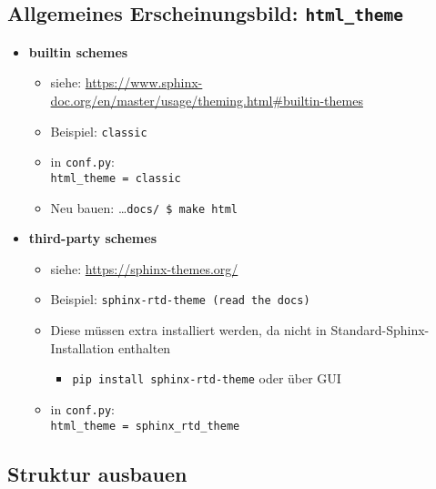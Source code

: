 \hypertarget{allgemeines-erscheinungsbild-html_theme}{%
	\subsection{\texorpdfstring{\textbf{Allgemeines Erscheinungsbild:
				\texttt{html\_theme}}}{Allgemeines Erscheinungsbild: html\_theme}}\label{allgemeines-erscheinungsbild-html_theme}}

\begin{itemize}	
	\item
	\textbf{builtin schemes}	
	\begin{itemize}	
		\item siehe:
		\url{https://www.sphinx-doc.org/en/master/usage/theming.html\#builtin-themes}
		\item
		Beispiel: \texttt{classic}
		\item
		in \texttt{conf.py}:\\ \hspace*{0.5cm}
		\texttt{html\_theme\ =\ \textquotesingle{}classic\textquotesingle{}}
		\item Neu bauen:
		\ldots{}\texttt{docs/\ \$\ make\ html}
	\end{itemize}
	\item
	\textbf{third-party schemes}
	\begin{itemize}
		\item siehe:
		\url{https://sphinx-themes.org/}
		\item
		Beispiel: \texttt{sphinx-rtd-theme\ (read\ the\ docs)}
		\item
		Diese müssen extra installiert werden, da nicht in Standard-Sphinx-Installation
		enthalten
		\begin{itemize}
			
			\item
			\texttt{pip\ install\ sphinx-rtd-theme} oder über GUI
		\end{itemize}
		\item
		in \texttt{conf.py}:\\ \hspace*{0.5cm}
		\texttt{html\_theme\ =\ \textquotesingle{}sphinx\_rtd\_theme\textquotesingle{}}
	\end{itemize}
\end{itemize}


\subsection{Struktur ausbauen}

